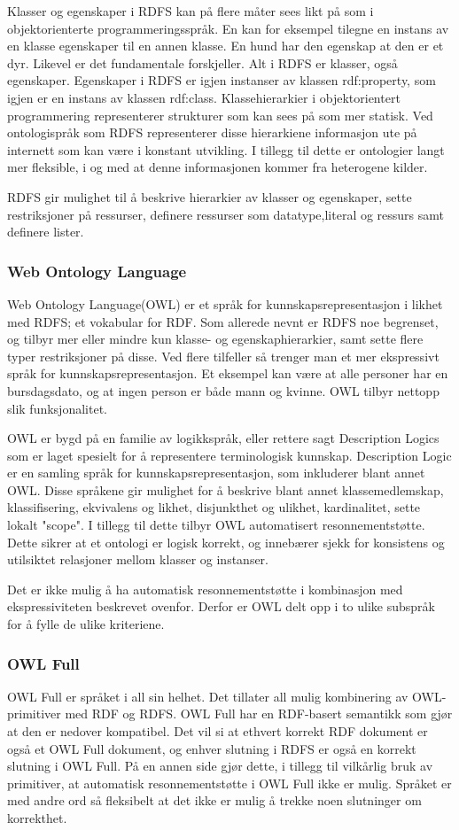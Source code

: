 Klasser og egenskaper i RDFS kan på flere måter sees likt på som i objektorienterte programmeringsspråk. En kan for eksempel tilegne en instans av en klasse egenskaper til en annen klasse. En hund har den egenskap at den er et dyr. Likevel er det fundamentale forskjeller. Alt i RDFS er klasser, også egenskaper. Egenskaper i RDFS er igjen instanser av klassen rdf:property, som igjen er en instans av klassen rdf:class. Klassehierarkier i objektorientert programmering representerer strukturer som kan sees på som mer statisk. Ved ontologispråk som RDFS representerer disse hierarkiene informasjon ute på internett som kan være i konstant utvikling. I tillegg til dette er ontologier langt mer fleksible, i og med at denne informasjonen kommer fra heterogene kilder.

RDFS gir mulighet til å beskrive hierarkier av klasser og egenskaper, sette restriksjoner på ressurser, definere ressurser som datatype,literal og ressurs samt definere lister.
\subsubsection{Web Ontology Language}
Web Ontology Language(OWL) er et språk for kunnskapsrepresentasjon i likhet med RDFS; et vokabular for RDF. Som allerede nevnt er RDFS noe begrenset, og tilbyr mer eller mindre kun klasse- og egenskaphierarkier, samt sette flere typer restriksjoner på disse. Ved flere tilfeller så trenger man et mer ekspressivt språk for kunnskapsrepresentasjon. Et eksempel kan være at alle personer har en bursdagsdato, og at ingen person er både mann og kvinne. OWL tilbyr nettopp slik funksjonalitet. 

OWL er bygd på en familie av logikkspråk, eller rettere sagt Description Logics som er laget spesielt for å representere terminologisk kunnskap. Description Logic er en samling språk for kunnskapsrepresentasjon, som inkluderer blant annet OWL. Disse språkene gir mulighet for å beskrive blant annet klassemedlemskap, klassifisering, ekvivalens og likhet, disjunkthet og ulikhet, kardinalitet, sette lokalt "scope". I tillegg til dette tilbyr OWL automatisert resonnementstøtte. Dette sikrer at et ontologi er logisk korrekt, og innebærer sjekk for konsistens og utilsiktet relasjoner mellom klasser og instanser. 

Det er ikke mulig å ha automatisk resonnementstøtte i kombinasjon med ekspressiviteten beskrevet ovenfor. Derfor er OWL delt opp i to ulike subspråk for å fylle de ulike kriteriene.
\subsubsection{OWL Full}
OWL Full er språket i all sin helhet. Det tillater all mulig kombinering av OWL-primitiver med RDF og RDFS. OWL Full har en RDF-basert semantikk som gjør at den er nedover kompatibel. Det vil si at ethvert korrekt RDF dokument er også et OWL Full dokument, og enhver slutning i RDFS er også en korrekt slutning i OWL Full. På en annen side gjør dette, i tillegg til vilkårlig bruk av primitiver, at automatisk resonnementstøtte i OWL Full ikke er mulig. Språket er med andre ord så fleksibelt at det ikke er mulig å trekke noen slutninger om korrekthet.
